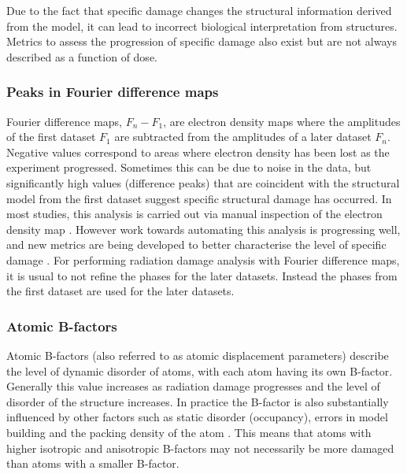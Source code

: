 		Due to the fact that specific damage changes the structural information derived from the model, it can lead to incorrect biological interpretation from structures.
		Metrics to assess the progression of specific damage also exist but are not always described as a function of dose.

        \subsubsection{Peaks in Fourier difference maps}
        \label{subs:Peaks in Fourier difference maps}
            Fourier difference maps, $F_n - F_1$, are electron density maps where the amplitudes of the first dataset $F_1$ are subtracted from the amplitudes of a later dataset $F_n$.
			Negative values correspond to areas where electron density has been lost as the experiment progressed.
			Sometimes this can be due to noise in the data, but significantly high values (difference peaks) that are coincident with the structural model from the first dataset suggest specific structural damage has occurred.
			In most studies, this analysis is carried out via manual inspection of the electron density map \cite{burmeister2000structural,weik2000,ravelli2000}.
			However work towards automating this analysis is progressing well, and new metrics are being developed to better characterise the level of specific damage \cite{bury2015radiation}.
            For performing radiation damage analysis with Fourier difference maps, it is usual to not refine the phases for the later datasets.
            Instead the phases from the first dataset are used for the later datasets.

        \subsubsection{Atomic B-factors}
        \label{subs:Atomic B-factors}
            Atomic B-factors (also referred to as atomic displacement parameters) describe the level of dynamic disorder of atoms, with each atom having its own B-factor.
			Generally this value increases as radiation damage progresses and the level of disorder of the structure increases.
			In practice the B-factor is also substantially influenced by other factors such as static disorder (occupancy), errors in model building and the packing density of the atom \cite{gerstel2015identifying}.
			This means that atoms with higher isotropic and anisotropic B-factors may not necessarily be more damaged than atoms with a smaller B-factor.

